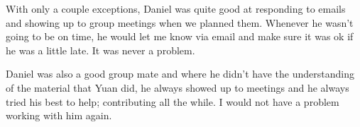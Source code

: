 \documentclass[a4paper]{article}
\begin{document}
With only a couple exceptions, Daniel was quite good at responding to emails and showing up to group meetings when we planned them. Whenever he wasn't going to be on time, he would let me know via email and make sure it was ok if he was a little late. It was never a problem. 

Daniel was also a good group mate and where he didn't have the understanding of the material that Yuan did, he always showed up to meetings and he always tried his best to help; contributing all the while.  I would not have a problem working with him again.
\end{document}
